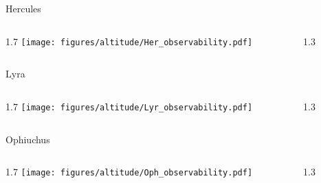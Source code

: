 \documentclass[final]{beamer}
\newlength{\colwidth}
\begin{document}
\begin{frame}[t]{}
    \Large{Hercules}
    \begin{columns}[T]
        \begin{column}{1.7\colwidth}
            \centering
            \texttt{[image: figures/altitude/Her\_observability.pdf]}
        \end{column}
        \begin{column}{1.3\colwidth}
            \Large
            
        \end{column}
    \end{columns}

    \Large{Lyra}
    \begin{columns}[T]
        \begin{column}{1.7\colwidth}
            \centering
            \texttt{[image: figures/altitude/Lyr\_observability.pdf]}
        \end{column}
        \begin{column}{1.3\colwidth}
            \Large
            
        \end{column}
    \end{columns}

    \Large{Ophiuchus}
    \begin{columns}[T]
        \begin{column}{1.7\colwidth}
            \centering
            \texttt{[image: figures/altitude/Oph\_observability.pdf]}
        \end{column}
        \begin{column}{1.3\colwidth}
            \Large
            
        \end{column}
    \end{columns}
\end{frame}

\end{document}
